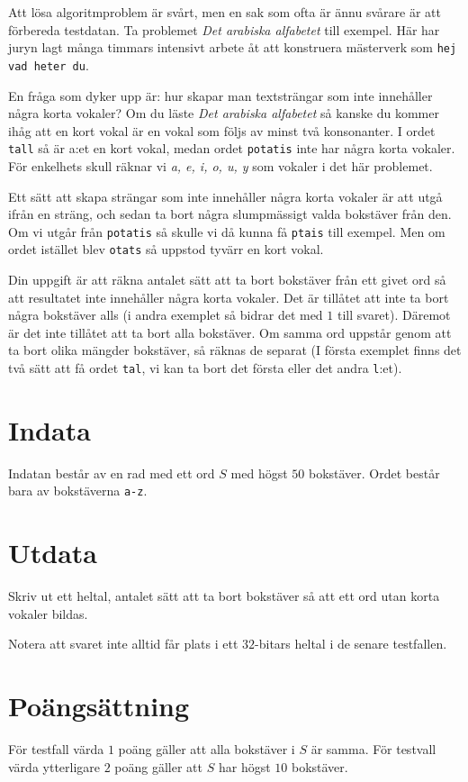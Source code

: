 Att lösa algoritmproblem är svårt, men en sak som ofta är ännu svårare är att förbereda
testdatan. Ta problemet \textit{Det arabiska alfabetet} till exempel. Här har juryn lagt
många timmars intensivt arbete åt att konstruera mästerverk som \texttt{hej vad heter du}.


En fråga som dyker upp är: hur skapar man textsträngar som inte innehåller några korta vokaler?
Om du läste \textit{Det arabiska alfabetet} så kanske du kommer ihåg att en kort vokal är en
vokal som följs av minst två konsonanter. I ordet \texttt{tall} så är a:et en kort vokal, medan
ordet \texttt{potatis} inte har några korta vokaler. För enkelhets skull räknar vi  \textit{a, e, i, o, u, y} 
som vokaler i det här problemet.


Ett sätt att skapa strängar som inte innehåller några korta vokaler är att utgå ifrån en sträng,
och sedan ta bort några slumpmässigt valda bokstäver från den. Om vi utgår från \texttt{potatis} så 
skulle vi då kunna få \texttt{ptais} till exempel. Men om ordet istället blev \texttt{otats} så uppstod
tyvärr en kort vokal.


Din uppgift är att räkna antalet sätt att ta bort bokstäver från ett givet ord så att resultatet inte
innehåller några korta vokaler. Det är tillåtet att inte ta bort några bokstäver alls (i andra exemplet
så bidrar det med $1$ till svaret). Däremot är det inte tillåtet att ta bort alla bokstäver. Om samma ord
uppstår genom att ta bort olika mängder bokstäver, så räknas de separat (I första exemplet finns det två sätt
att få ordet \texttt{tal}, vi kan ta bort det första eller det andra \texttt{l}:et).

\section*{Indata}
Indatan består av en rad med ett ord $S$ med högst $50$ bokstäver. Ordet består bara av bokstäverna \texttt{a-z}.

\section*{Utdata}
Skriv ut ett heltal, antalet sätt att ta bort bokstäver så att ett ord utan korta vokaler bildas.

Notera att svaret inte alltid får plats i ett $32$-bitars heltal i de senare testfallen.

\section*{Poängsättning}
För testfall värda $1$ poäng gäller att alla bokstäver i $S$ är samma.
För testvall värda ytterligare $2$ poäng gäller att $S$ har högst $10$ bokstäver.
